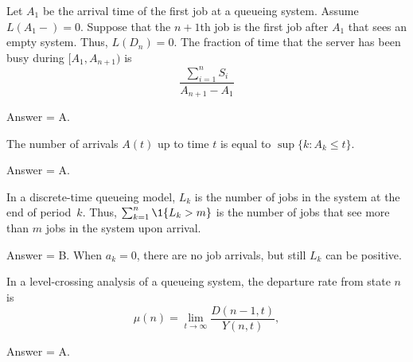 \begin{exercise}[201802]
Let $A_1$ be the arrival time of the first job at a queueing system. Assume $L(A_1-)=0$. Suppose that the $n+1$th job is the first job after $A_1$ that sees an empty system. Thus,
 $L(D_n)=0$. The fraction of time that the server has been busy during $[A_1, A_{n+1})$ is
 \begin{equation*}
\frac{\sum_{i=1}^n S_i}{A_{n+1}-A_1} 
 \end{equation*}

\begin{solution}
Answer = A.
\end{solution}
\end{exercise}

\begin{exercise}[201802]
The number of arrivals $A(t)$ up to time $t$ is equal to $\sup\{k : A_k\leq t\}$. 
\begin{solution}
Answer = A.
\end{solution}
\end{exercise}

\begin{exercise}[201802]
In a discrete-time queueing model, $L_k$ is the number of jobs in the system at the end of period~$k$. Thus, $\sum_{k=1}^n \1{L_k > m}$ is the number of jobs that see more than $m$ jobs in the system upon arrival. 
\begin{solution}
Answer = B. When $a_k=0$, there are no job arrivals, but still $L_k$ can be positive.
\end{solution}
\end{exercise}

\begin{exercise}[201802]
In a level-crossing analysis of a queueing system, the departure rate from state $n$ is 
\begin{equation*}
 \mu(n) = \lim_{t\to\infty} \frac{D(n-1,t)}{Y(n,t)},
\end{equation*}

\begin{solution}
Answer = A.
\end{solution}
\end{exercise}

